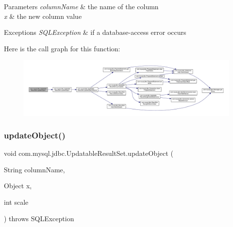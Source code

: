 \begin{DoxyParams}{Parameters}
{\em column\+Name} & the name of the column \\
\hline
{\em x} & the new column value\\
\hline
\end{DoxyParams}

\begin{DoxyExceptions}{Exceptions}
{\em S\+Q\+L\+Exception} & if a database-\/access error occurs \\
\hline
\end{DoxyExceptions}
Here is the call graph for this function\+:
\nopagebreak
\begin{figure}[H]
\begin{center}
\leavevmode
\includegraphics[width=350pt]{classcom_1_1mysql_1_1jdbc_1_1_updatable_result_set_abf296b039e8adf6ac5b8a2aabaac86a7_cgraph}
\end{center}
\end{figure}
\mbox{\label{classcom_1_1mysql_1_1jdbc_1_1_updatable_result_set_ae0fe84cc37c1b19c829fd325f1e7e60f}} 
\subsubsection{\texorpdfstring{update\+Object()}{updateObject()}\hspace{0.1cm}{\footnotesize\ttfamily [4/4]}}
{\footnotesize\ttfamily void com.\+mysql.\+jdbc.\+Updatable\+Result\+Set.\+update\+Object (\begin{DoxyParamCaption}\item[{String}]{column\+Name,  }\item[{Object}]{x,  }\item[{int}]{scale }\end{DoxyParamCaption}) throws S\+Q\+L\+Exception}

